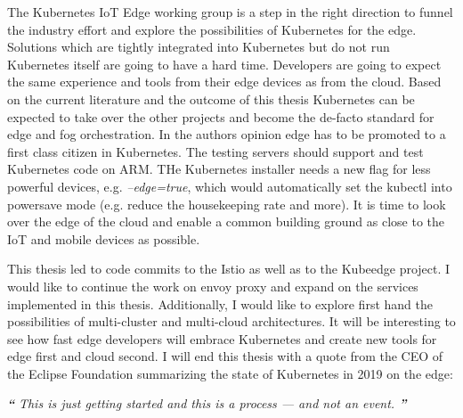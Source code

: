 The Kubernetes IoT Edge working group\cite{IntroducingDejanBosanac:KubernetesIoTEdgeWorkingGroup} is a step in the right direction to funnel the industry effort and explore the possibilities of Kubernetes for the edge. Solutions which are tightly integrated into Kubernetes but do not run Kubernetes itself are going to have a hard time. Developers are going to expect the same experience and tools from their edge devices as from the cloud. Based on the current literature and the outcome of this thesis Kubernetes can be expected to take over the other projects and become the de-facto standard for edge and fog orchestration. In the authors opinion edge has to be promoted to a first class citizen in Kubernetes. The testing servers should support and test Kubernetes code on ARM. THe Kubernetes installer needs a new flag for less powerful devices, e.g. \textit{--edge=true}, which would automatically set the kubectl into powersave mode (e.g. reduce the housekeeping rate and more). It is time to look over the edge of the cloud and enable a common building ground as close to the IoT and mobile devices as possible.

This thesis led to code commits to the Istio as well as to the Kubeedge project. I would like to continue the work on envoy proxy and expand on the services implemented in this thesis. Additionally, I would like to explore first hand the possibilities of multi-cluster and multi-cloud architectures. It will be interesting to see how fast edge developers will embrace Kubernetes and create new tools for edge first and cloud second.
I will end this thesis with a quote from the CEO of the Eclipse Foundation summarizing the state of Kubernetes in 2019 on the edge:
\begin{displayquote}
\textit{\textbf{\Huge{``}}}
\textit{\large{
This is just getting started and this is a process — and not an event.\cite{ioFogMainBlog:online}
}}
\textit{\textbf{\Huge{''}}}
\\[1pt]
\end{displayquote}

